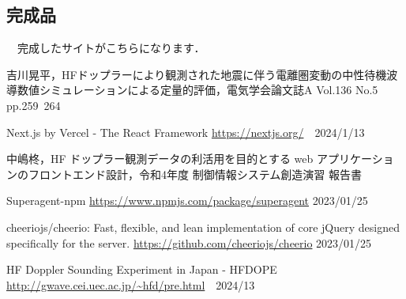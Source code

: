 \subsection{完成品}
　完成したサイトがこちらになります．
\small
\begin{thebibliography}{99}
\setlength{\itemsep}{0pt}
\smallskip

吉川晃平，HFドップラーにより観測された地震に伴う電離圏変動の中性待機波導数値シミュレーションによる定量的評価，電気学会論文誌A Vol.136 No.5 pp.259~264

Next.js by Vercel - The React Framework
\url{https://nextjs.org/}　2024/1/13

中嶋柊，HF ドップラー観測データの利活用を目的とする web アプリケーションのフロントエンド設計，令和4年度 制御情報システム創造演習 報告書

Superagent-npm 
\url{https://www.npmjs.com/package/superagent}  2023/01/25

cheeriojs/cheerio: Fast, flexible, and lean implementation of core jQuery designed specifically for the server. 
\url{https://github.com/cheeriojs/cheerio}  2023/01/25 

HF Doppler Sounding Experiment in Japan - HFDOPE
\url{http://gwave.cei.uec.ac.jp/~hfd/pre.html}　2024/13

\end{thebibliography}
\normalsize





